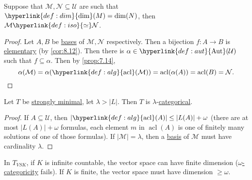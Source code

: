 \documentclass{article}
\DeclareMathOperator{\Aut}{Aut}
\DeclareMathOperator{\acl}{acl}
\newcommand{\M}{\mathcal{M}}
\renewcommand{\N}{\mathcal{N}}
\newcommand{\U}{\mathcal{U}}
\begin{document}
\begin{nthm}\label{thm:8.14}
  Suppose that $\M, \N \subseteq \U$ are such that $\hyperlink{def:dim}{\dim}(M) = \dim(N)$, then $\M \hyperlink{def:iso}{\simeq} \N$.
\end{nthm}
\begin{proof}
  Let $A,B$ be \hyperlink{def:basis}{bases} of $\M,\N$ respectively.
  Then a bijection $f: A \to B$ is \hyperlink{def:upe}{elementary} (by \cref{cor:8.12}).
  Then there is $\alpha \in \hyperlink{def:aut}{\Aut}(\U)$ such that $f \subseteq \alpha$. Then by \cref{prop:7.14},
  \begin{equation*}
    \alpha(\M) = \alpha(\hyperlink{def:alg}{\acl}(\M)) = \acl(\alpha(A)) = \acl(B) = \N. \qedhere
  \end{equation*}
\end{proof}
\begin{ncor}\label{cor:8.15}
  Let $T$ be \hyperlink{def:minimal}{strongly minimal}, let $\lambda > |L|$. Then $T$ is $\lambda$-\hyperlink{def:wcat}{categorical}.
\end{ncor}
\begin{proof}
  If $A \subseteq \mathcal{U}$, then $|\hyperlink{def:alg}{\acl}(A)| \leq |L(A)| + \omega$ (there are at most $|L(A)| + \omega$ formulas, each element $m$ in $\acl(A)$ is one of finitely many solutions of one of those formulas).
  If $|\mathcal{M}| = \lambda$, then a \hyperlink{def:basis}{basis} of $\M$ must have cardinality $\lambda$.
\end{proof}

In \hyperlink{def:vsk}{$T_{VSK}$}, if $K$ is infinite countable, the vector space can have finite dimension (\hyperlink{def:wcat}{$\omega$-categoricity} fails). If $K$ is finite, the vector space must have dimension $\geq \omega$.

\clearpage
\end{document}
